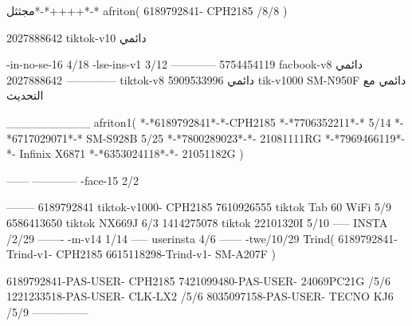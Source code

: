 مجثثل*-*++++*-*
afriton(
6189792841- CPH2185  /8/8
)

2027888642 tiktok-v10
دائمي

-in-no-se-16 4/18
-lse-ins-v1 3/12
------------
5754454119 facbook-v8
دائمي
--------------
2027888642 tiktok-v8
دائمي
5909533996 tik-v1000  SM-N950F
دائمي مع التحديث

__________
afriton1(
*-*6189792841*-*-CPH2185
*-*7706352211*-* 5/14
*-*6717029071*-*  SM-S928B 5/25
*-*7800289023*-*- 21081111RG \5\7
*-*7969466119*-*- Infinix X6871 \5
*-*6353024118*-*- 21051182G \5
)


------
------------
-face-15 2/2

--------
6189792841 tiktok-v1000- CPH2185 
7610926555 tiktok Tab 60 WiFi  5/9
6586413650 tiktok NX669J  6/3
1414275078 tiktok 22101320I  5/10
-----
 INSTA /2/29
-------
-m-v14 1/14
-----
userinsta 4/6
------
-twe/10/29
Trind(
6189792841-Trind-v1- CPH2185 
6615118298-Trind-v1- SM-A207F \5\9
)

6189792841-PAS-USER- CPH2185 
7421099480-PAS-USER- 24069PC21G /5/6
1221233518-PAS-USER- CLK-LX2 /5/6
8035097158-PAS-USER- TECNO KJ6  /5/9
    ---------------

